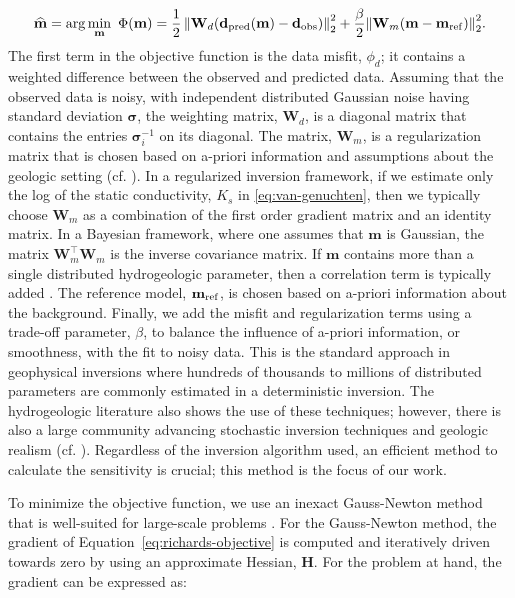 \documentclass[preprint,review,3p,times,onecolumn,authoryear]{elsarticle}
\newcommand{\bfH}{\mathbf{H}}
\newcommand{\bfW}{\mathbf{W}}
\newcommand{\bfm}{\mathbf{m}}
\begin{document}
\begin{equation}
\label{eq:richards-objective}
\widehat{\mathbf{m}} =
{\rm arg}\min_{\mathbf{m}}\ \Phi ( \mathbf{m} ) =
\frac{1}{2} \left\|\mathbf{W}_d (\mathbf{d}_{\rm pred}(\mathbf{m})- \mathbf{d}_{\rm obs}) \right\|^2_2+
\frac { \beta  }{ 2 } { \left\| \mathbf{W}_m(\mathbf{m}- \mathbf{m} _{\rm ref }) \right\|  }^2_2.
\end{equation}
The first term in the objective function is the data misfit, $\phi_d$; it contains a weighted difference between the observed and predicted data. Assuming that the observed data is noisy, with independent distributed Gaussian noise having standard deviation $\boldsymbol{\sigma}$, the weighting matrix, $\bfW_d$, is a diagonal matrix that contains the entries $ \boldsymbol{\sigma}_{i}^{-1}$ on its diagonal. The matrix, $\bfW_m$, is a regularization matrix that is chosen based on a-priori information and assumptions about the geologic setting (cf. \cite{DougTutorial}). In a regularized inversion framework, if we estimate only the log of the static conductivity, $K_{s}$ in \eqref{eq:van-genuchten}, then we typically choose $\bfW_m$  as a combination of the first order gradient matrix and an identity matrix. In a Bayesian framework, where one assumes that $\bfm$ is Gaussian, the matrix $\bfW_m^\top \bfW_m$ is the inverse covariance matrix. If $\bfm$ contains more than a single distributed hydrogeologic parameter, then a correlation term is typically added \citep{HaberHoltzman2013}. The reference model, $\bfm_{\rm ref}$, is chosen based on a-priori information about the background. Finally, we add the misfit and regularization terms using a trade-off parameter, $\beta$, to balance the influence of a-priori information, or smoothness, with the fit to noisy data. This is the standard approach in geophysical inversions \citep{tikhonov1977, DougTutorial, Constable1987, haber2015computational} where hundreds of thousands to millions of distributed parameters are commonly estimated in a deterministic inversion. The hydrogeologic literature also shows the use of these techniques; however, there is also a large community advancing stochastic inversion techniques and geologic realism (cf. \cite{Linde2015}). Regardless of the inversion algorithm used, an efficient method to calculate the sensitivity is crucial; this method is the focus of our work.

To minimize the objective function, we use an inexact Gauss-Newton method that is well-suited for large-scale problems \citep{nw}. For the Gauss-Newton method, the gradient of Equation~\ref{eq:richards-objective} is computed and iteratively driven towards zero by using an approximate Hessian, $\bfH$. For the problem at hand, the gradient can be expressed as:
\end{document}
